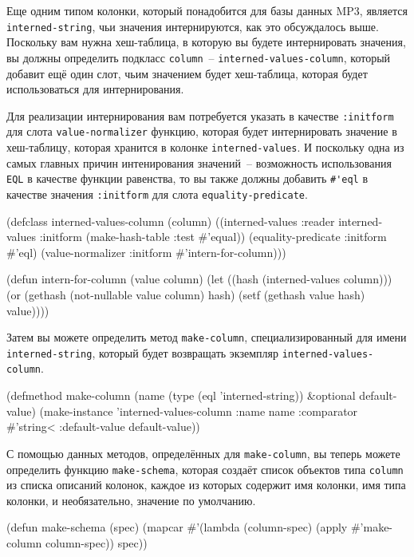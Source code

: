 Еще одним типом колонки, который понадобится для базы данных MP3, является
\lstinline{interned-string}, чьи значения интернируются, как это обсуждалось выше.  Поскольку
вам нужна хеш-таблица, в которую вы будете интернировать значения, вы должны определить
подкласс \lstinline{column}~-- \lstinline{interned-values-column}, который добавит ещё один слот,
чьим значением будет хеш-таблица, которая будет использоваться для интернирования.

Для реализации интернирования вам потребуется указать в качестве \lstinline{:initform} для
слота \lstinline{value-normalizer} функцию, которая будет интернировать значение в хеш-таблицу,
которая хранится в колонке \lstinline{interned-values}.  И поскольку одна из самых главных
причин интенирования значений~-- возможность использования \lstinline{EQL} в качестве функции
равенства, то вы также должны добавить \lstinline!#'eql! в качестве значения \lstinline{:initform}
для слота \lstinline{equality-predicate}.

\begin{myverb}
(defclass interned-values-column (column)
  ((interned-values
    :reader interned-values
    :initform (make-hash-table :test #'equal))
   (equality-predicate :initform #'eql)
   (value-normalizer   :initform #'intern-for-column)))

(defun intern-for-column (value column)
  (let ((hash (interned-values column)))
    (or (gethash (not-nullable value column) hash)
        (setf (gethash value hash) value))))
\end{myverb}

Затем вы можете определить метод \lstinline{make-column}, специализированный для имени
\lstinline{interned-string}, который будет возвращать экземпляр \lstinline{interned-values-column}.

\begin{myverb}
(defmethod make-column (name (type (eql 'interned-string)) &optional default-value)
  (make-instance 
   'interned-values-column
   :name name
   :comparator #'string< 
   :default-value default-value))
\end{myverb}

С помощью данных методов, определённых для \lstinline{make-column}, вы теперь можете определить
функцию \lstinline{make-schema}, которая создаёт список объектов типа \lstinline{column} из списка
описаний колонок, каждое из которых содержит имя колонки, имя типа колонки, и
необязательно, значение по умолчанию.

\begin{myverb}
(defun make-schema (spec)
  (mapcar #'(lambda (column-spec) (apply #'make-column column-spec)) spec))
\end{myverb}


